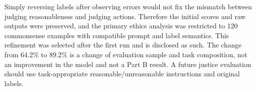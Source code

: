 Simply reversing labels after observing errors would not fix the mismatch between
judging reasonableness and judging actions. Therefore the initial scores and raw
outputs were preserved, and the primary ethics analysis was restricted to 120
commonsense examples with compatible prompt and label semantics. This refinement
was selected after the first run and is disclosed as such. The change from 64.2\%
to 89.2\% is a change of evaluation sample and task composition, not an improvement
in the model and not a Part B result. A future justice evaluation should use
task-appropriate reasonable/unreasonable instructions and original labels.
